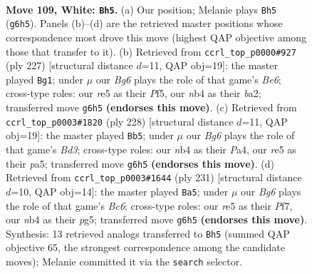 \documentclass[11pt]{article}
\begin{document}
\clearpage

\begin{figure}[p]\centering
\begin{subfigure}{0.46\textwidth}\centering
\resizebox{\linewidth}{!}{%
\newchessgame
\chessboard[
  setfen={8/6k1/6B1/4r1p1/1n6/6K1/8/8 w - - 2 109},
  showmover=false,
  pgfstyle=straightmove, color=movearrow, markmove={g6-h5}
]}
\caption{}
\end{subfigure}\hfill
\begin{subfigure}{0.46\textwidth}\centering
\resizebox{\linewidth}{!}{%
\newchessgame
\chessboard[
  setfen={8/4k3/8/4Pp2/8/4bK2/B7/8 b - - 2 114},
  showmover=false,
  pgfstyle=straightmove, color=movearrow, markmove={e3-g1}
]}
\caption{}
\end{subfigure}
\\[4pt]
\begin{subfigure}{0.46\textwidth}\centering
\resizebox{\linewidth}{!}{%
\newchessgame
\chessboard[
  setfen={8/8/8/p7/Pp1k4/3B4/8/2K5 w - - 83 115},
  showmover=false,
  pgfstyle=straightmove, color=movearrow, markmove={d3-b5}
]}
\caption{}
\end{subfigure}\hfill
\begin{subfigure}{0.46\textwidth}\centering
\resizebox{\linewidth}{!}{%
\newchessgame
\chessboard[
  setfen={8/3k1p2/8/6P1/4K3/1Rb5/8/8 b - - 86 116},
  showmover=false,
  pgfstyle=straightmove, color=movearrow, markmove={c3-a5}
]}
\caption{}
\end{subfigure}
\caption{\textbf{Move 109, White: \texttt{Bh5}.} (a) Our position; Melanie plays \texttt{Bh5} (\texttt{g6h5}). Panels (b)--(d) are the retrieved master positions whose correspondence most drove this move (highest QAP objective among those that transfer to it). (b) Retrieved from \texttt{ccrl\_top\_p0000\#927} (ply 227) [structural distance $d$=11, QAP obj=19]: the master played \texttt{Bg1}; under $\mu$ our \emph{Bg6} plays the role of that game's \emph{Be6}; cross-type roles: our \emph{r}e5 as their \emph{P}f5, our \emph{n}b4 as their \emph{b}a2; transferred move \texttt{g6h5} \textbf{(endorses this move)}. (c) Retrieved from \texttt{ccrl\_top\_p0003\#1820} (ply 228) [structural distance $d$=11, QAP obj=19]: the master played \texttt{Bb5}; under $\mu$ our \emph{Bg6} plays the role of that game's \emph{Bd3}; cross-type roles: our \emph{n}b4 as their \emph{P}a4, our \emph{r}e5 as their \emph{p}a5; transferred move \texttt{g6h5} \textbf{(endorses this move)}. (d) Retrieved from \texttt{ccrl\_top\_p0003\#1644} (ply 231) [structural distance $d$=10, QAP obj=14]: the master played \texttt{Ba5}; under $\mu$ our \emph{Bg6} plays the role of that game's \emph{Bc6}; cross-type roles: our \emph{r}e5 as their \emph{P}f7, our \emph{n}b4 as their \emph{p}g5; transferred move \texttt{g6h5} \textbf{(endorses this move)}. Synthesis: 13 retrieved analogs transferred to \texttt{Bh5} (summed QAP objective 65, the strongest correspondence among the candidate moves); Melanie committed it via the \texttt{search} selector.}
\label{fig:thought-m216}
\end{figure}
\end{document}
